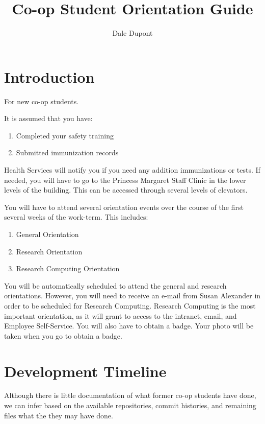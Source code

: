 \documentclass{article}
\title{Co-op Student Orientation Guide}
\author{Dale Dupont}
\begin{document}
\maketitle

\tableofcontents

\newpage

\section{Introduction}

For new co-op students.

It is assumed that you have:
\begin{enumerate}
\item Completed your safety training
\item Submitted immunization records
\end{enumerate}
Health Services will notify you if you need any addition immunizations
or tests. If needed, you will have to go to the Princess Margaret
Staff Clinic in the lower levels of the building. This can be accessed
through several levels of elevators.

You will have to attend several orientation events over the course of the
first several weeks of the work-term. This includes:
\begin{enumerate}
\item General Orientation
\item Research Orientation
\item Research Computing Orientation
\end{enumerate}
You will be automatically scheduled to attend the general and research orientations. However, you will need to receive an e-mail from Susan Alexander in order to be scheduled for Research Computing. Research Computing is the most important orientation, as it will grant to access to the intranet, email,  and Employee Self-Service. You will also have to obtain a badge. Your photo will be taken when you go to obtain a badge. 


\section{Development Timeline}

Although there is little documentation of what former co-op students have done, we can infer based on the available repositories, commit histories, and remaining files what the they may have done.
\end{document}
